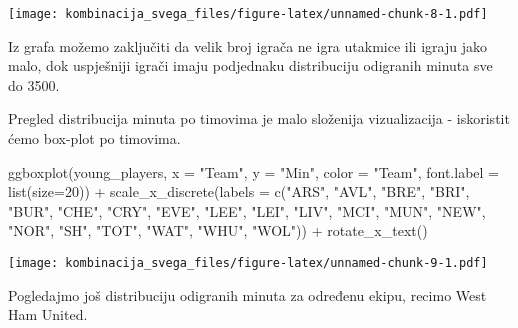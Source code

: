 \documentclass[
]{article}
\newenvironment{Shaded}{\begin{snugshade}}{\end{snugshade}}
\newcommand{\AttributeTok}[1]{\textcolor[rgb]{0.77,0.63,0.00}{#1}}
\newcommand{\DecValTok}[1]{\textcolor[rgb]{0.00,0.00,0.81}{#1}}
\newcommand{\FunctionTok}[1]{\textcolor[rgb]{0.00,0.00,0.00}{#1}}
\newcommand{\NormalTok}[1]{#1}
\newcommand{\OtherTok}[1]{\textcolor[rgb]{0.56,0.35,0.01}{#1}}
\newcommand{\SpecialCharTok}[1]{\textcolor[rgb]{0.00,0.00,0.00}{#1}}
\newcommand{\StringTok}[1]{\textcolor[rgb]{0.31,0.60,0.02}{#1}}
\begin{document}
\texttt{[image: kombinacija\_svega\_files/figure-latex/unnamed-chunk-8-1.pdf]}

Iz grafa možemo zaključiti da velik broj igrača ne igra utakmice ili
igraju jako malo, dok uspješniji igrači imaju podjednaku distribuciju
odigranih minuta sve do 3500.

Pregled distribucija minuta po timovima je malo složenija vizualizacija
- iskoristit ćemo box-plot po timovima.

\begin{Shaded}
\begin{Highlighting}[]
\FunctionTok{ggboxplot}\NormalTok{(young\_players, }\AttributeTok{x =} \StringTok{"Team"}\NormalTok{, }\AttributeTok{y =} \StringTok{"Min"}\NormalTok{, }\AttributeTok{color =} \StringTok{"Team"}\NormalTok{, }\AttributeTok{font.label =} \FunctionTok{list}\NormalTok{(}\AttributeTok{size=}\DecValTok{20}\NormalTok{)) }\SpecialCharTok{+} \FunctionTok{scale\_x\_discrete}\NormalTok{(}\AttributeTok{labels =} \FunctionTok{c}\NormalTok{(}\StringTok{"ARS"}\NormalTok{, }\StringTok{"AVL"}\NormalTok{, }\StringTok{"BRE"}\NormalTok{, }\StringTok{"BRI"}\NormalTok{, }\StringTok{"BUR"}\NormalTok{, }\StringTok{"CHE"}\NormalTok{, }\StringTok{"CRY"}\NormalTok{, }\StringTok{"EVE"}\NormalTok{, }\StringTok{"LEE"}\NormalTok{, }\StringTok{"LEI"}\NormalTok{, }\StringTok{"LIV"}\NormalTok{, }\StringTok{"MCI"}\NormalTok{, }\StringTok{"MUN"}\NormalTok{, }\StringTok{"NEW"}\NormalTok{, }\StringTok{"NOR"}\NormalTok{, }\StringTok{"SH"}\NormalTok{, }\StringTok{"TOT"}\NormalTok{, }\StringTok{"WAT"}\NormalTok{, }\StringTok{"WHU"}\NormalTok{, }\StringTok{"WOL"}\NormalTok{)) }\SpecialCharTok{+} \FunctionTok{rotate\_x\_text}\NormalTok{()}
\end{Highlighting}
\end{Shaded}

\texttt{[image: kombinacija\_svega\_files/figure-latex/unnamed-chunk-9-1.pdf]}

Pogledajmo još distribuciju odigranih minuta za određenu ekipu, recimo
West Ham United.

\begin{Shaded}
\end{Shaded}
\end{document}
